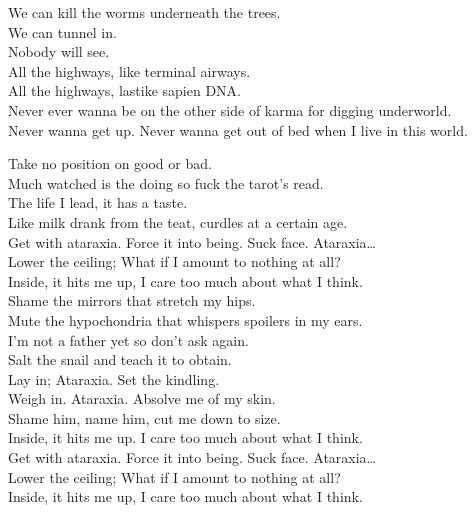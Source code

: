 We can kill the worms underneath the trees. \\
We can tunnel in. \\
Nobody will see. \\

All the highways, like terminal airways. \\
All the highways, lastike sapien DNA. \\

Never ever wanna be on the other side of karma for digging underworld. \\
Never wanna get up. Never wanna get out of bed when I live in this world. \\




Take no position on good or bad. \\
Much watched is the doing so fuck the tarot's read. \\
The life I lead, it has a taste. \\
Like milk drank from the teat, curdles at a certain age. \\

Get with ataraxia. Force it into being. Suck face. Ataraxia… \\
Lower the ceiling; What if I amount to nothing at all? \\
Inside, it hits me up, I care too much about what I think. \\

Shame the mirrors that stretch my hips. \\
Mute the hypochondria that whispers spoilers in my ears. \\
I'm not a father yet so don't ask again. \\
Salt the snail and teach it to obtain. \\

Lay in; Ataraxia. Set the kindling. \\
Weigh in. Ataraxia. Absolve me of my skin. \\
Shame him, name him, cut me down to size. \\
Inside, it hits me up. I care too much about what I think. \\

Get with ataraxia. Force it into being. Suck face. Ataraxia… \\
Lower the ceiling; What if I amount to nothing at all? \\
Inside, it hits me up, I care too much about what I think. \\


